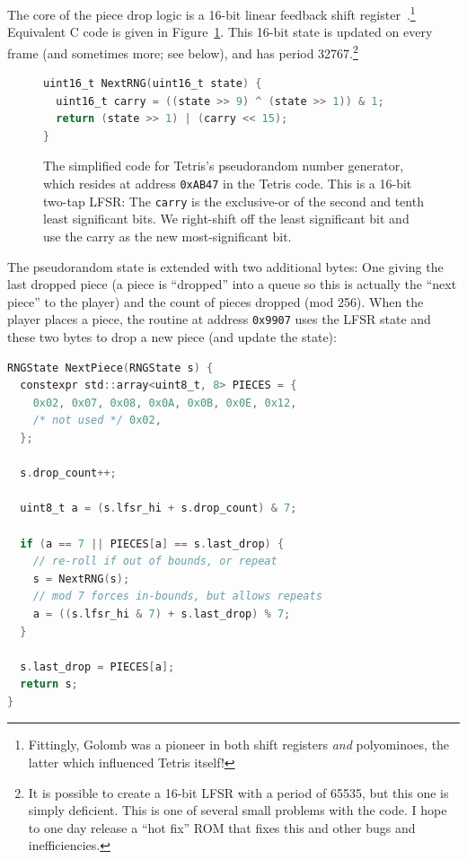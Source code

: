 \documentclass[twocolumn]{article}
\begin{document}
The core of the piece drop logic is a 16-bit linear feedback shift
register~\cite{golomb1967shift}.\!\footnote{Fittingly, Golomb was a
  pioneer in both shift registers {\em and} polyominoes, the latter
  which influenced Tetris itself!} Equivalent C code is given in
Figure~\ref{fig:nextrng}. This 16-bit state is updated on every frame
(and sometimes more; see below), and has period 32767.\footnote{ It is
  possible to create a 16-bit LFSR with a period of 65535, but this
  one is simply deficient. This is one of several small problems with
  the code. I hope to one day release a ``hot fix'' ROM that fixes
  this and other bugs and inefficiencies.}

\begin{figure}
  \centering
  \begin{lstlisting}[language=C]
uint16_t NextRNG(uint16_t state) {
  uint16_t carry = ((state >> 9) ^ (state >> 1)) & 1;
  return (state >> 1) | (carry << 15);
}
  \end{lstlisting}
  \caption { The simplified code for Tetris's pseudorandom number
    generator, which resides at address {\tt 0xAB47} in the Tetris
    code. This is a 16-bit two-tap LFSR: The {\tt carry} is the
    exclusive-or of the second and tenth least significant bits. We
    right-shift off the least significant bit and use the carry as the
    new most-significant bit.} \label{fig:nextrng}
\end{figure}

The pseudorandom state is extended with two additional bytes: One
giving the last dropped piece (a piece is ``dropped'' into a queue so
this is actually the ``next piece'' to the player) and the count of
pieces dropped (mod 256). When the player places a piece, the routine
at address {\tt 0x9907} uses the LFSR state and these two bytes to
drop a new piece (and update the state):

\begin{lstlisting}[language=C]
RNGState NextPiece(RNGState s) {
  constexpr std::array<uint8_t, 8> PIECES = {
    0x02, 0x07, 0x08, 0x0A, 0x0B, 0x0E, 0x12,
    /* not used */ 0x02,
  };

  s.drop_count++;

  uint8_t a = (s.lfsr_hi + s.drop_count) & 7;

  if (a == 7 || PIECES[a] == s.last_drop) {
    // re-roll if out of bounds, or repeat
    s = NextRNG(s);
    // mod 7 forces in-bounds, but allows repeats
    a = ((s.lfsr_hi & 7) + s.last_drop) % 7;
  }
  
  s.last_drop = PIECES[a];
  return s;
}
\end{lstlisting}
\end{document}
